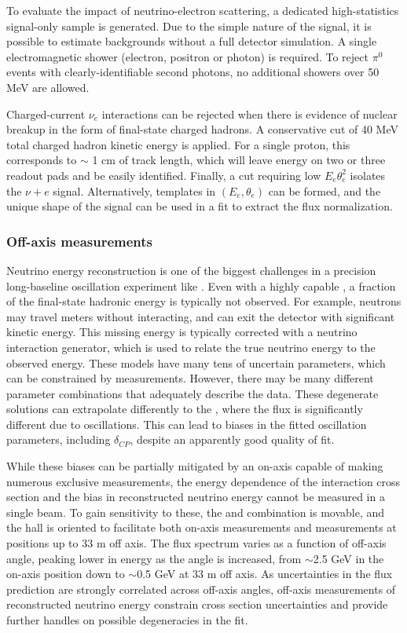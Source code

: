 To evaluate the impact of neutrino-electron scattering, a dedicated high-statistics signal-only sample is generated. Due to the simple nature of the signal, it is possible to estimate backgrounds without a full detector simulation. A single electromagnetic shower (electron, positron or photon) is required. To reject $\pi^{0}$ events with clearly-identifiable second photons, no additional showers over 50 MeV are allowed.

Charged-current $\nu_{e}$ interactions can be rejected when there is evidence of nuclear breakup in the form of final-state charged hadrons. A conservative cut of 40 MeV total charged hadron kinetic energy is applied. For a single proton, this corresponds to $\sim$ 1 cm of track length, which will leave energy on two or three readout pads and be easily identified. Finally, a cut requiring low $E_{e}\theta_{e}^{2}$ isolates the $\nu+e$ signal. Alternatively, templates in $(E_{e}, \theta_{e})$ can be formed, and the unique shape of the signal can be used in a fit to extract the flux normalization.

\subsubsection{Off-axis  measurements}
\label{sec:ch-nu-osc-06-ndconcept-offaxis}

Neutrino energy reconstruction is one of the biggest challenges in a precision long-baseline oscillation experiment like . Even with a highly capable , a fraction of the final-state hadronic energy is typically not observed. For example, neutrons may travel meters without interacting, and can exit the detector with significant kinetic energy. This missing energy is typically corrected with a neutrino interaction generator, which is used to relate the true neutrino energy to the observed energy. These models have many tens of uncertain parameters, which can be constrained by  measurements. However, there may be many different parameter combinations that adequately describe the  data. These degenerate solutions can extrapolate differently to the , where the flux is significantly different due to oscillations. This can lead to biases in the fitted oscillation parameters, including $\delta_{CP}$, despite an apparently good quality of fit.

While these biases can be partially mitigated by an on-axis  capable of making numerous exclusive measurements, the energy dependence of the interaction cross section and the bias in reconstructed neutrino energy cannot be measured in a single beam. To gain sensitivity to these, the  and  combination is movable, and the  hall is oriented to facilitate both on-axis measurements and measurements at positions up to 33 m off axis. The flux spectrum varies as a function of off-axis angle, peaking lower in energy as the angle is increased, from $\sim$2.5 GeV in the on-axis position down to $\sim$0.5 GeV at 33 m off axis. As uncertainties in the flux prediction are strongly correlated across off-axis angles, off-axis measurements of reconstructed neutrino energy constrain cross section uncertainties and provide further handles on possible degeneracies in the fit. 

